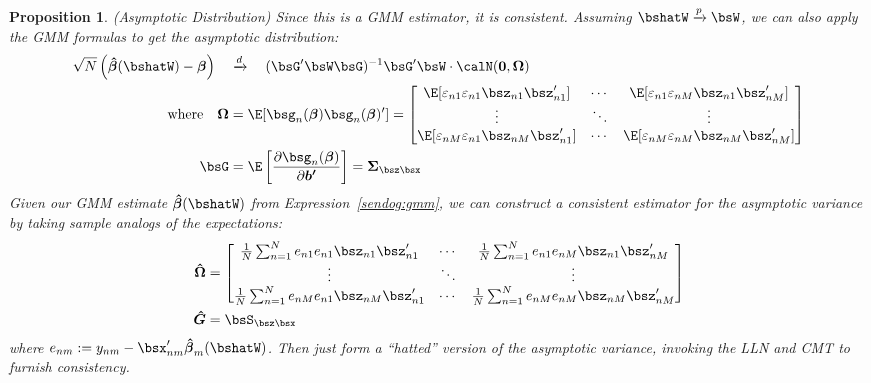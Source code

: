 \documentclass[12pt]{article}
\theoremstyle{plain}
\newtheorem{prop}[thm]{Proposition}
\theoremstyle{definition}
\theoremstyle{remark}
\newcommand{\bsSigma}{\boldsymbol{\Sigma}}
\newcommand{\bsbeta}{\boldsymbol{\beta}}
\newcommand{\bshatG}{\boldsymbol{\hat{G}}}
\newcommand{\bsOmega}{\boldsymbol{\Omega}}
\newcommand{\bshatbeta}{\boldsymbol{\hat{\beta}}}
\newcommand{\bshatOmega}{\boldsymbol{\hat{\Omega}}}
\renewcommand{\bso}{\boldsymbol{0}}
\newcommand{\bsbp}{\boldsymbol{b'}}
\newcommand{\Var}{\operatorname{Var}}
\newcommand{\pto}{\xrightarrow{p}}
\newcommand{\dto}{\xrightarrow{d}}
\newcommand{\sumnN}{\sum^N_{n=1}}
\begin{document}
\begin{prop}\emph{(Asymptotic Distribution)}
\label{prop:multgmmasymptotics}
Since this is a GMM estimator, it is consistent. Assuming
$\bshatW\pto\bsW$, we can also apply the GMM formulas to get the
asymptotic distribution:
\begin{align*}
  \sqrt{N}\left(\bshatbeta(\bshatW) - \bsbeta\right)
  \quad &\dto \quad
  (\bsG'\bsW\bsG)^{-1}\bsG'\bsW\cdot
  \calN(\bso,\bsOmega) \\
  \text{where}\quad
  \bsOmega &=
    \E[\bsg_n(\bsbeta)\bsg_n(\bsbeta)']
    =
    \begin{bmatrix}
      \E[\varepsilon_{n1}\varepsilon_{n1}\bsz_{n1}\bsz_{n1}']
      &\cdots &
      \E[\varepsilon_{n1}\varepsilon_{nM}\bsz_{n1}\bsz_{nM}']
      \\
      \vdots & \ddots & \vdots
      \\
      \E[\varepsilon_{nM}\varepsilon_{n1}\bsz_{nM}\bsz_{n1}']
      &\cdots &
      \E[\varepsilon_{nM}\varepsilon_{nM}\bsz_{nM}\bsz_{nM}']
    \end{bmatrix}
  \\
  \bsG &=
  \E\left[
    \frac{\partial \bsg_n(\bsbeta)}{\partial \bsbp}
  \right]
  =
  \bsSigma_{\bsz\bsx}
\end{align*}
Given our GMM estimate $\bshatbeta(\bshatW)$ from
Expression~\ref{sendog:gmm}, we can construct a consistent estimator for
the asymptotic variance by taking sample analogs of the expectations:
\begin{align}
  \bshatOmega &=
  \begin{bmatrix}
    \frac{1}{N}\sumnN e_{n1}e_{n1}\bsz_{n1}\bsz_{n1}'
    &\cdots &
    \frac{1}{N}\sumnN e_{n1}e_{nM}\bsz_{n1}\bsz_{nM}'
    \\
    \vdots & \ddots & \vdots
    \\
    \frac{1}{N}\sumnN e_{nM}e_{n1}\bsz_{nM}\bsz_{n1}'
    &\cdots &
    \frac{1}{N}\sumnN e_{nM}e_{nM}\bsz_{nM}\bsz_{nM}'
  \end{bmatrix}
  \label{mgmm:omegahat}
  \\
  \bshatG
  &=
  \bsS_{\bsz\bsx}
  \notag
\end{align}
where $e_{nm} := y_{nm} - \bsx_{nm}'\bshatbeta_m(\bshatW)$.
Then just form a ``hatted'' version of the asymptotic variance, invoking
the LLN and CMT to furnish consistency.
\end{prop}
\end{document}

